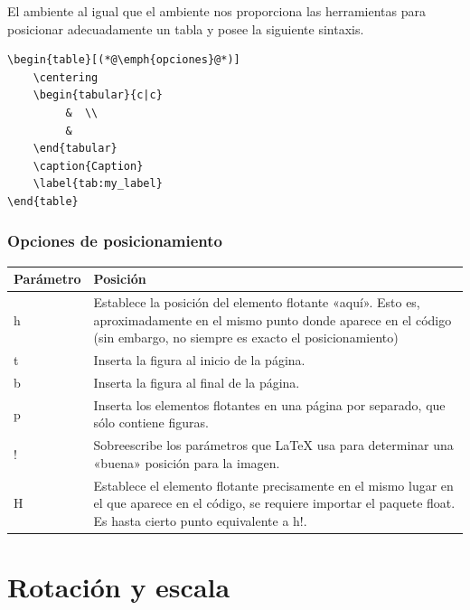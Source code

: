 \documentclass[a4,10pt]{aleph-notas}
\begin{document}
El ambiente \verb@table@ al igual que el ambiente \verb@figure@ nos proporciona las herramientas para posicionar adecuadamente un tabla y posee la siguiente sintaxis.

\begin{lstlisting}[frame=single]
\begin{table}[(*@\emph{opciones}@*)]
    \centering
    \begin{tabular}{c|c}
         &  \\
         & 
    \end{tabular}
    \caption{Caption}
    \label{tab:my_label}
\end{table}
\end{lstlisting}

\subsubsection{Opciones de posicionamiento}

\renewcommand{\arraystretch}{1.5}

\begin{center}
    \begin{tabular}{|p{2cm}|p{10cm}|}
        \hline
        \textbf{Parámetro} & \textbf{Posición} \\ \hline
          h & Establece la posición del elemento flotante «aquí». Esto es, aproximadamente en el mismo punto donde aparece en el código (sin embargo, no siempre es exacto el posicionamiento)\\\hline
         t & Inserta la figura al inicio de la página.  \\ \hline 
         b & Inserta la figura al final de la página.  \\ \hline
         p &Inserta los elementos flotantes en una página por separado, que sólo contiene figuras. \\ \hline
         ! & Sobreescribe los parámetros que \LaTeX{} usa para determinar una «buena» posición para la imagen.  \\\hline
         H & Establece el elemento flotante precisamente en el mismo lugar en el que aparece en el código, se requiere importar el paquete float. Es hasta cierto punto equivalente a h!.\\  \hline
    \end{tabular}
\end{center}

\renewcommand{\arraystretch}{1}

\section{Rotación y escala}
\end{document}
